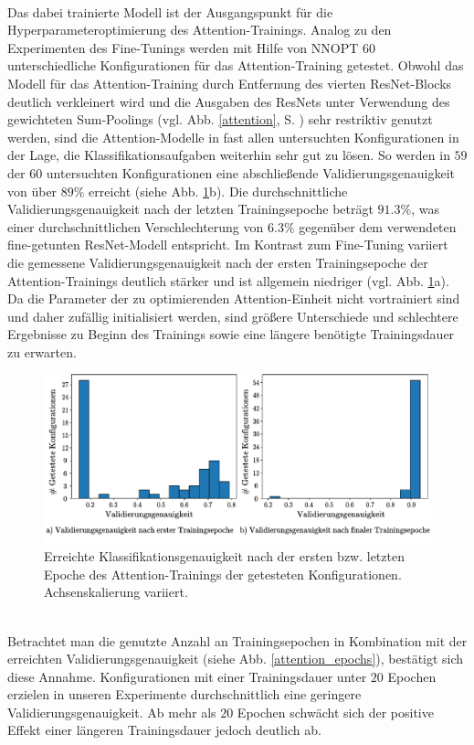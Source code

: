 \\
Das dabei trainierte Modell ist der Ausgangspunkt für die Hyperparameteroptimierung des Attention-Trainings. Analog zu den Experimenten des Fine-Tunings werden mit Hilfe von NNOPT $60$ unterschiedliche Konfigurationen für das Attention-Training getestet. Obwohl das Modell für das Attention-Training durch Entfernung des vierten ResNet-Blocks deutlich verkleinert wird und die Ausgaben des ResNets unter Verwendung des gewichteten Sum-Poolings (vgl. Abb. \ref{attention}, S. \pageref{attention}) sehr restriktiv genutzt werden, sind die Attention-Modelle in fast allen untersuchten Konfigurationen in der Lage, die Klassifikationsaufgaben weiterhin sehr gut zu lösen. So werden in $59$ der $60$ untersuchten Konfigurationen eine abschließende Validierungsgenauigkeit von über $89\%$ erreicht (siehe Abb. \ref{attention_int_end}b). Die durchschnittliche Validierungsgenauigkeit nach der letzten Trainingsepoche beträgt $91.3\%$, was einer durchschnittlichen Verschlechterung von $6.3\%$ gegenüber dem verwendeten fine-getunten ResNet-Modell entspricht. Im Kontrast zum Fine-Tuning variiert die gemessene Validierungsgenauigkeit nach der ersten Trainingsepoche der Attention-Trainings deutlich stärker und ist allgemein niedriger (vgl. Abb. \ref{attention_int_end}a). Da die Parameter der zu optimierenden Attention-Einheit nicht vortrainiert sind und daher zufällig initialisiert werden, sind größere Unterschiede und schlechtere Ergebnisse zu Beginn des Trainings sowie eine längere benötigte Trainingsdauer zu erwarten.
\begin{figure}[h]
\includegraphics[scale=0.75]{NNOPT/init_and_end_perf_attention.pdf}
\caption{Erreichte Klassifikationsgenauigkeit nach der ersten bzw. letzten Epoche des Attention-Trainings der getesteten Konfigurationen. Achsenskalierung variiert.}
\label{attention_int_end}
\end{figure}
\\
Betrachtet man die genutzte Anzahl an Trainingsepochen in Kombination mit der erreichten Validierungsgenauigkeit (siehe Abb. \ref{attention_epochs}), bestätigt sich diese Annahme. Konfigurationen mit einer Trainingsdauer unter $20$ Epochen erzielen in unseren Experimente durchschnittlich eine geringere Validierungsgenauigkeit. Ab mehr als $20$ Epochen schwächt sich der positive Effekt einer längeren Trainingsdauer jedoch deutlich ab.
